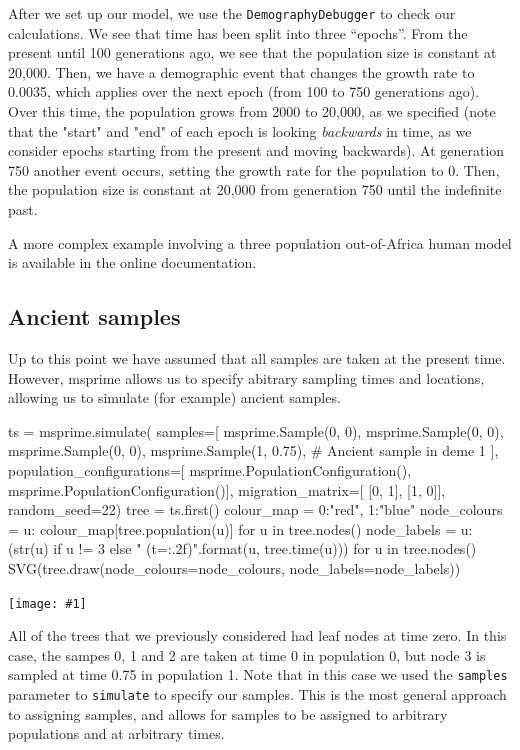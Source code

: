 \documentclass[graybox]{svmult}
\newcommand{\includenbimage}[1]{\begin{center}\texttt{[image: \#1]}\end{center}}
\begin{document}
    After we set up our model, we use the \texttt{DemographyDebugger} to
check our calculations. We see that time has been split into three
``epochs''. From the present until 100 generations ago, we see that the
population size is constant at 20,000. Then, we have a demographic event
that changes the growth rate to 0.0035, which applies over the next
epoch (from 100 to 750 generations ago). Over this time, the population
grows from 2000 to 20,000, as we specified (note that the "start" and
"end" of each epoch is looking \emph{backwards} in time, as we consider
epochs starting from the present and moving backwards). At generation
750 another event occurs, setting the growth rate for the population to
0. Then, the population size is constant at 20,000 from generation 750
until the indefinite past.

A more complex example involving a three population out-of-Africa human
model is available in the online documentation.

\subsection{Ancient samples}\label{ancient-samples}

Up to this point we have assumed that all samples are taken at the
present time. However, msprime allows us to specify abitrary sampling
times and locations, allowing us to simulate (for example) ancient
samples.

\begin{pythoncode}
ts = msprime.simulate(
    samples=[
        msprime.Sample(0, 0), msprime.Sample(0, 0), msprime.Sample(0, 0),
        msprime.Sample(1, 0.75), # Ancient sample in deme 1
    ],
    population_configurations=[
        msprime.PopulationConfiguration(),
        msprime.PopulationConfiguration()],
    migration_matrix=[
        [0, 1],
        [1, 0]],
    random_seed=22)
tree = ts.first()
colour_map = {0:"red", 1:"blue"}
node_colours = {u: colour_map[tree.population(u)] for u in tree.nodes()}
node_labels = {
    u: (str(u) if u != 3 else "{} (t={:.2f})".format(u, tree.time(u)))
    for u in tree.nodes()}
SVG(tree.draw(node_colours=node_colours, node_labels=node_labels))
\end{pythoncode}

\includenbimage{images/simulations_45_0.pdf}

All of the trees that we previously considered had leaf nodes at time
zero. In this case, the sampes 0, 1 and 2 are taken at time 0 in
population 0, but node 3 is sampled at time 0.75 in population 1. Note
that in this case we used the \texttt{samples} parameter to
\texttt{simulate} to specify our samples. This is the most general
approach to assigning samples, and allows for samples to be assigned to
arbitrary populations and at arbitrary times.
\end{document}
